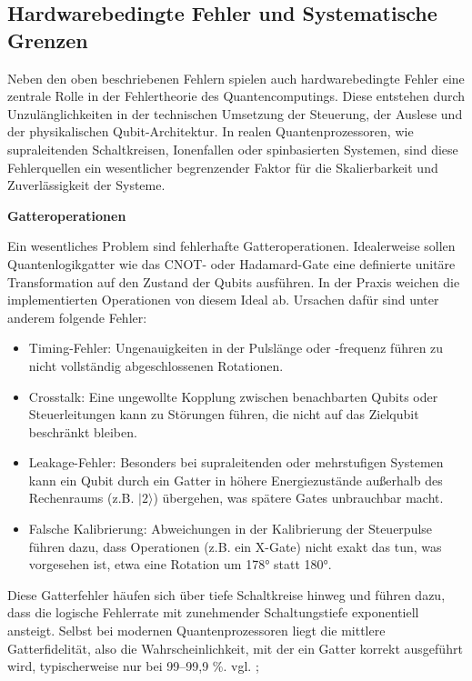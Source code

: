 \subsection{Hardwarebedingte Fehler und Systematische Grenzen}
Neben den oben beschriebenen Fehlern spielen auch hardwarebedingte Fehler eine zentrale Rolle in der Fehlertheorie des Quantencomputings. Diese entstehen durch Unzulänglichkeiten in der technischen Umsetzung der Steuerung, der Auslese und der physikalischen Qubit-Architektur. In realen Quantenprozessoren, wie supraleitenden Schaltkreisen, Ionenfallen oder spinbasierten Systemen, sind diese Fehlerquellen ein wesentlicher begrenzender Faktor für die Skalierbarkeit und Zuverlässigkeit der Systeme.\medskip



\textbf{Gatteroperationen}

Ein wesentliches Problem sind fehlerhafte Gatteroperationen. Idealerweise sollen Quantenlogikgatter wie das CNOT- oder Hadamard-Gate eine definierte unitäre Transformation auf den Zustand der Qubits ausführen. In der Praxis weichen die implementierten Operationen von diesem Ideal ab. Ursachen dafür sind unter anderem folgende Fehler:

\begin{itemize}
     

\item Timing-Fehler: Ungenauigkeiten in der Pulslänge oder -frequenz führen zu nicht vollständig abgeschlossenen Rotationen.
\item Crosstalk: Eine ungewollte Kopplung zwischen benachbarten Qubits oder Steuerleitungen kann zu Störungen führen, die nicht auf das Zielqubit beschränkt bleiben.
 \item Leakage-Fehler: Besonders bei supraleitenden oder mehrstufigen Systemen kann ein Qubit durch ein Gatter in höhere Energiezustände außerhalb des Rechenraums (z.B. $|2\rangle$) übergehen, was spätere Gates unbrauchbar macht.
\item Falsche Kalibrierung: Abweichungen in der Kalibrierung der Steuerpulse führen dazu, dass Operationen (z.B. ein X-Gate) nicht exakt das tun, was vorgesehen ist, etwa eine Rotation um 178° statt 180°.
\end{itemize}
Diese Gatterfehler häufen sich über tiefe Schaltkreise hinweg und führen dazu, dass die logische Fehlerrate mit zunehmender Schaltungstiefe exponentiell ansteigt. Selbst bei modernen Quantenprozessoren liegt die mittlere Gatterfidelität, also die Wahrscheinlichkeit, mit der ein Gatter korrekt ausgeführt wird, typischerweise nur bei 99–99,9 \%. vgl. \cite[Seite 2-5]{acharyaQuantumErrorCorrection2025a}; \cite[Seite 5-13]{kang_timeadaptive_2025}\medskip




